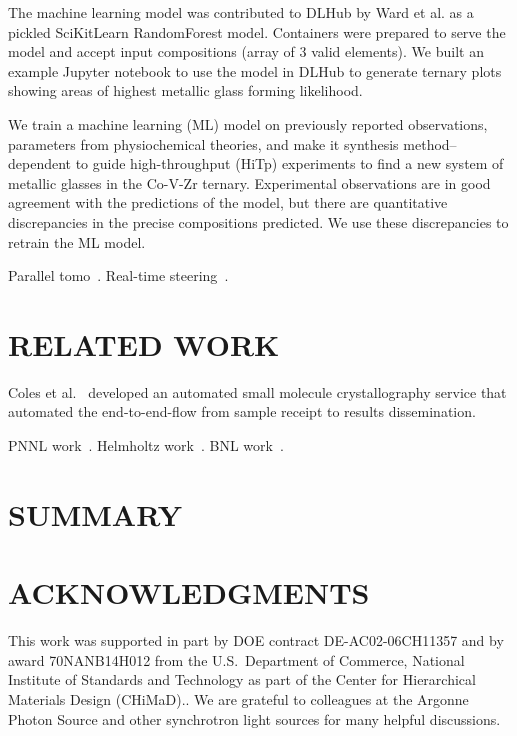 \documentclass{aip-cp}
\newcommand\ben[1]{}
\newcommand\ben[1]{{\color{blue}[Ben: #1]}}
\begin{document}
The machine learning model was contributed to DLHub by Ward et al. as a
pickled SciKitLearn RandomForest model. Containers were prepared to serve the
model and accept input compositions (array of 3 valid elements). We built an
example Jupyter notebook  to use the model in DLHub to generate ternary plots
showing areas of highest metallic glass forming likelihood.

\ben{cite https://github.com/fang-ren/}

We train a machine learning (ML) model on previously reported observations,
parameters from physiochemical theories, and make it synthesis
method–dependent to guide high-throughput (HiTp) experiments to find a new
system of metallic glasses in the Co-V-Zr ternary. Experimental observations
are in good agreement with the predictions of the model, but there are
quantitative discrepancies in the precise compositions predicted. We use these
discrepancies to retrain the ML model.

\ben{cite Ward et al (BMG Nature)}


\ben{Add DLHub usage details here}

\ben{Other potential models to highlight, CANDLE Benchmarks,
Segmentation of Tomographic Reconstruction of Connectomes in Mouse Brains}



Parallel tomo~\cite{Bicer_Europar15}. Real-time steering~\cite{bicer2017real}.

\section{RELATED WORK}

Coles et al.~\cite{coles2005ecses,coles2006science} developed an automated small molecule crystallography service that automated the
end-to-end-flow from sample receipt to results dissemination.

PNNL work~\cite{thomas2015towards}. Helmholtz work~\cite{gehrke2015high}. BNL work~\cite{deslippe2014workflow}.


\section{SUMMARY}









\section{ACKNOWLEDGMENTS}

This work was supported in part by DOE contract DE-AC02-06CH11357 and by award 70NANB14H012 from the U.S.\  Department of Commerce, National Institute of Standards and Technology as part of the Center for Hierarchical Materials Design (CHiMaD)..
We are grateful to colleagues at the Argonne Photon Source and other synchrotron light sources
for many helpful discussions.


\nocite{*}
%
%
\end{document}
